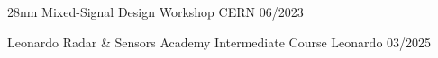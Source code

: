 

\begin{cvhonors}
  \cvhonor
    {28nm Mixed-Signal Design Workshop} %
    {CERN} %
    {} %
    {06/2023} %

  \cvhonor
    {Leonardo Radar \& Sensors Academy Intermediate Course} %
    {Leonardo} %
    {} %
    {03/2025} %

\end{cvhonors}